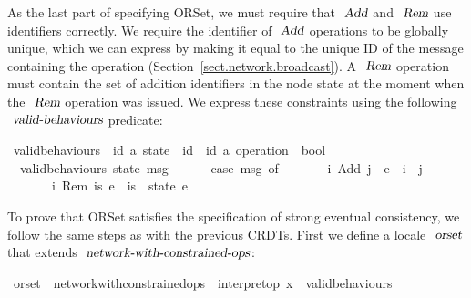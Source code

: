 As the last part of specifying ORSet, we must require that $\isa{Add}$ and $\isa{Rem}$ use identifiers correctly.
We require the identifier of $\isa{Add}$ operations to be globally unique, which we can express by making it equal to the unique ID of the message containing the operation (Section~\ref{sect.network.broadcast}).
A $\isa{Rem}$ operation must contain the set of addition identifiers in the node state at the moment when the $\isa{Rem}$ operation was issued.
We express these constraints using the following $\isa{valid-behaviours}$ predicate:
\begin{isabelle}
\ valid{\isacharunderscore}behaviours\ {\isacharcolon}{\isacharcolon}\ {\isachardoublequoteopen}{\isacharparenleft}{\isacharprime}id{\isacharcomma}\ {\isacharprime}a{\isacharparenright}\ state\ {\isasymRightarrow}\ {\isacharprime}id\ {\isasymtimes}\ {\isacharparenleft}{\isacharprime}id{\isacharcomma}\ {\isacharprime}a{\isacharparenright}\ operation\ {\isasymRightarrow}\ bool{\isachardoublequoteclose}\ \isanewline
\ \ {\isachardoublequoteopen}valid{\isacharunderscore}behaviours\ state\ msg\ {\isasymequiv}\isanewline
\ \ \ \ \ case\ msg\ of\isanewline
\ \ \ \ \ \ \ {\isacharparenleft}i{\isacharcomma}\ Add\ j\ \ e{\isacharparenright}\ {\isasymRightarrow}\ i\ {\isacharequal}\ j\ {\isacharbar}\isanewline
\ \ \ \ \ \ \ {\isacharparenleft}i{\isacharcomma}\ Rem\ is\ e{\isacharparenright}\ {\isasymRightarrow}\ is\ {\isacharequal}\ state\ e{\isachardoublequoteclose}
\end{isabelle}
To prove that ORSet satisfies the specification of strong eventual consistency, we follow the same steps as with the previous CRDTs.
First we define a locale $\isa{orset}$ that extends $\isa{network-with-constrained-ops}$:
\begin{isabelle}
\ orset\ {\isacharequal}\ network{\isacharunderscore}with{\isacharunderscore}constrained{\isacharunderscore}ops\ {\isacharunderscore}\ interpret{\isacharunderscore}op\ {\isachardoublequoteopen}{\isacharparenleft}{\isasymlambda}x{\isachardot}\ {\isacharbraceleft}{\isacharbraceright}{\isacharparenright}{\isachardoublequoteclose}\ valid{\isacharunderscore}behaviours
\end{isabelle}

